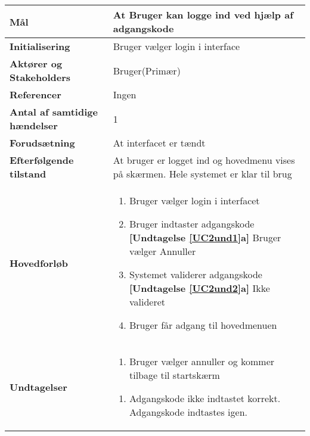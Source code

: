 \begin{table}[H] \centering
\begin{tabular}{|p{6cm}|p{8cm}|}
	\hline
\textbf{Mål}								
&At Bruger kan logge ind ved hjælp af adgangskode
 \\\hline
\textbf{Initialisering}					
&Bruger vælger login i interface
 \\\hline
\textbf{Aktører og Stakeholders}			
&Bruger(Primær)
 \\\hline
\textbf{Referencer}						
&Ingen
 \\\hline
\textbf{Antal af samtidige hændelser}	
&1
 \\\hline
\textbf{Forudsætning}					
&At interfacet er tændt
 \\\hline
\textbf{Efterfølgende tilstand}			
&At bruger er logget ind og hovedmenu vises på skærmen. Hele systemet er klar til brug
 \\\hline
\textbf{Hovedforløb}						
& 
\begin{enumerate}

\item Bruger vælger login i interfacet

\item \label{UC2und1}Bruger indtaster adgangskode \newline
\textbf{[Undtagelse \ref{UC2und1}a]} Bruger vælger Annuller

\item \label{UC2und2} Systemet validerer adgangskode \newline
\textbf{[Undtagelse \ref{UC2und2}a]} Ikke valideret

\item Bruger får adgang til hovedmenuen	
 
\end{enumerate}
\\\hline

\textbf{Undtagelser}						
&\begin{enumerate}[label= \ref{UC8und1}a.]
			\item Bruger vælger annuller og kommer tilbage til startskærm
		\end{enumerate}
											
		\begin{enumerate}[label= \ref{UC8und2}a.]
			\item Adgangskode ikke indtastet korrekt. Adgangskode indtastes igen.
		\end{enumerate} \\\hline


	\end{tabular}
	\label{UC1} 
\end{table}